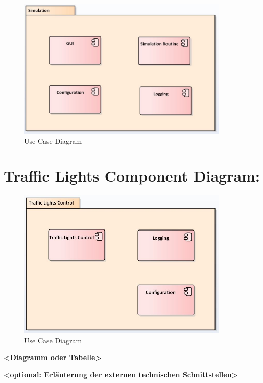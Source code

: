 \begin{figure}[H]
	\centering
	\includegraphics[width=0.9\textwidth]{img/Simulation_Component_Diagram.JPG}
	\caption{Use Case Diagram}
	\label{img:Simulation_Component_Diagram}
\end{figure}

\chapter{Traffic Lights Component Diagram:}

\begin{figure}[H]
	\centering
	\includegraphics[width=0.9\textwidth]{img/TrafficLights_Component_Diagram.JPG}
	\caption{Use Case Diagram}
	\label{img:TrafficLights_Component_Diagram}
\end{figure}

\textbf{\textless{}Diagramm oder Tabelle\textgreater{}}

\textbf{\textless{}optional: Erläuterung der externen technischen
Schnittstellen\textgreater{}}

